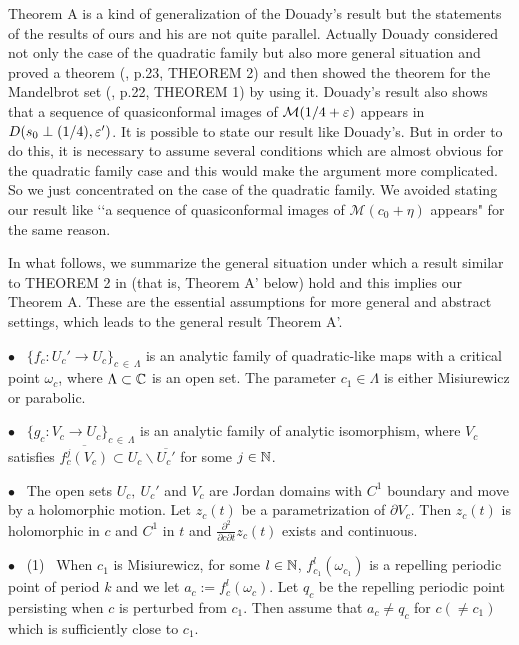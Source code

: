 \begin{rem*}
Theorem A is a kind of generalization of the Douady's result but
the statements of the results of ours and his are not quite parallel.
Actually Douady considered not only the case of the quadratic family
but also more general situation and proved a theorem 
(\cite{Douady 2000}, p.23, THEOREM 2) and then showed the theorem for 
the Mandelbrot set (\cite{Douady 2000}, p.22, THEOREM 1) by using it. 
Douady's result also shows that a sequence of quasiconformal images of 
${\mathcal M}(1/4 + \varepsilon)$ appears in 
$D(s_0 \perp (1/4), \varepsilon')$. It is possible to state our result like 
Douady's. But in order to do this, it is necessary to assume several 
conditions which are almost obvious for the quadratic family case and 
this would make the argument more complicated. So we just concentrated 
on the case of the quadratic family. We avoided stating our result like 
\lq\lq a sequence of quasiconformal images of 
${\mathcal M}(c_0 + \eta)$ appears" for the same reason.

In what follows, we summarize the general situation under which a result similar
to THEOREM 2 in \cite{Douady 2000} (that is, Theorem A' below) hold and this 
implies our Theorem A. These are the  essential assumptions for more
general and abstract settings, which leads to the general result Theorem A'.

\medskip

\noin
$\bullet$ \
$\{ f_c : U_c' \to U_c \}_{c \,\in\, \Lambda}$ is an analytic family of
quadratic-like maps with a critical point $\omega_c$, where $\Lambda \subset \mathbb C$
is an open set. The parameter $c_1 \in \Lambda$ is either Misiurewicz or 
parabolic.

\noin
$\bullet$ \
$\{ g_c : V_c \to U_c \}_{c \,\in\, \Lambda}$ is an analytic family of analytic
isomorphism, where $V_c$ satisfies 
$\overline{f_c^j(V_c)} \subset U_c \smallsetminus \overline{U_c'}$ 
for some $j \in \mathbb N$.

\noin
$\bullet$ \
The open sets $U_c, \ U_c'$ and $V_c$ are Jordan domains with $C^1$ boundary
and move by a holomorphic motion. Let $z_c(t)$ be a parametrization
of $\partial V_c$. Then $z_c(t)$ is holomorphic in $c$ and $C^1$ in $t$ and
$\frac{\partial^2}{\partial c \partial t}z_c(t)$ exists and continuous.


\noin
$\bullet$ \
(1) \ When $c_1$ is Misiurewicz, for some $l \in \mathbb N$, 
$f_{c_1}^l(\omega_{c_1})$ is a repelling periodic point of period $k$ 
and we let $a_c := f_c^l(\omega_c)$.
Let $q_c$ be the repelling periodic point persisting when $c$ is perturbed 
from $c_1$. Then assume that $a_c \ne q_c$ for $c (\ne c_1)$ which is 
sufficiently close to $c_1$.


\end{rem*}
